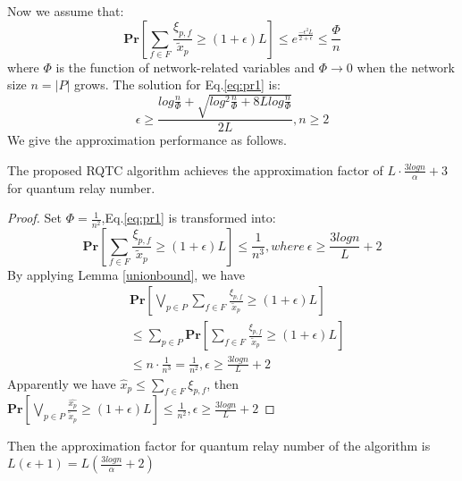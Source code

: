 Now we assume that:
\begin{equation}\label{eq:pr1}
\textbf{Pr}[\sum_{f \in F} \frac{\xi_{p,f}}{\widetilde{x}_p } \ge (1+\epsilon)L] \le e^{\frac{-\epsilon^2L}{2+\epsilon}} \le \frac{\Phi}{n}
\end{equation}
where $\Phi$ is the function of network-related variables and $\Phi \rightarrow 0$ when the network size $n = |P|$ grows. The solution for Eq.\ref{eq:pr1} is:
\begin{equation}\label{solution1}
\epsilon \ge \frac{log\frac{n}{\Phi}+\sqrt{log^2\frac{n}{\Phi}+8L log\frac{n}{\Phi}}}{2L},n \ge 2
\end{equation}
We give the approximation performance as follows.
\begin{theorem}\label{the:x}
	The proposed RQTC algorithm achieves the approximation factor of $L \cdot \frac{3logn}{\alpha}+3$ for quantum relay number.
\end{theorem}
\begin{proof}
	Set $\Phi = \frac{1}{n^2}$,Eq.\ref{eq:pr1} is transformed into:
	\begin{equation}
	\textbf{Pr}[\sum_{f \in F} \frac{\xi_{p,f}}{\widetilde{x}_p } \ge (1+\epsilon)L] \le \frac{1}{n^3},where \ \epsilon \ge \frac{3logn}{L}+2
	\end{equation}
	By applying Lemma \ref{unionbound}, we have
	\begin{equation}
	\begin{aligned}
	&\textbf{Pr}[\bigvee_{p \in P}\sum_{f \in F} \frac{\xi_{p,f}}{\widetilde{x}_p} \ge (1+\epsilon)L]\\ &\le \sum_{p \in P}\textbf{Pr}[\sum_{f \in F} \frac{\xi_{p,f}}{\widetilde{x}_p } \ge (1+\epsilon)L]\\
	&\le n\cdot \frac{1}{n^3} = \frac{1}{n^2}, \epsilon \ge \frac{3logn}{L}+2
	\end{aligned}
	\end{equation}
	Apparently we have $\hat{x}_p \le \sum_{f \in F} \xi_{p,f}$, then $\textbf{Pr}[\bigvee_{p \in P}{\frac{\hat{x_p}}{\widetilde{x}_p}} \ge (1+\epsilon)L] \le \frac{1}{n^2}, \epsilon \ge \frac{3logn}{L}+2$
\end{proof}

Then the approximation factor for quantum relay number of the algorithm is $L(\epsilon + 1) = L(\frac{3logn}{\alpha}+2)$




